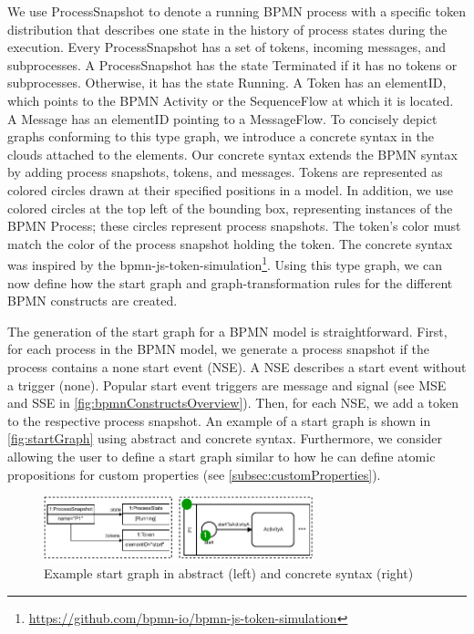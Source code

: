 \documentclass[runningheads]{llncs}
\begin{document}
We use \textsf{ProcessSnapshot} to denote a running BPMN process with a specific token distribution that describes one state in the history of process states during the execution.
Every \textsf{ProcessSnapshot} has a set of \textsf{tokens}, incoming \textsf{messages}, and \textsf{subprocesses}.
A \textsf{ProcessSnapshot} has the state \textsf{Terminated} if it has no \textsf{tokens} or \textsf{subprocesses}.
Otherwise, it has the state \textsf{Running}.
A \textsf{Token} has an \textsf{elementID}, which points to the BPMN \textsf{Activity} or the \textsf{SequenceFlow} at which it is located.
A \textsf{Message} has an \textsf{elementID} pointing to a \textsf{MessageFlow}.
To concisely depict graphs conforming to this type graph, we introduce a concrete syntax in the clouds attached to the elements.
Our concrete syntax extends the BPMN syntax by adding process snapshots, tokens, and messages.
Tokens are represented as colored circles drawn at their specified positions in a model.
In addition, we use colored circles at the top left of the bounding box, representing instances of the BPMN \textsf{Process}; these circles represent process snapshots.
The token's color must match the color of the process snapshot holding the token.
The concrete syntax was inspired by the bpmn-js-token-simulation\footnote{\url{https://github.com/bpmn-io/bpmn-js-token-simulation}}.
Using this type graph, we can now define how the start graph and graph-transformation rules for the different BPMN constructs are created.

The generation of the start graph for a BPMN model is straightforward.
First, for each process in the BPMN model, we generate a process snapshot if the process contains a none start event (NSE).
A NSE describes a start event without a trigger (none).
Popular start event triggers are message and signal (see MSE and SSE in \autoref{fig:bpmnConstructsOverview}).
Then, for each NSE, we add a token to the respective process snapshot.
An example of a start graph is shown in \autoref{fig:startGraph} using abstract and concrete syntax.
Furthermore, we consider allowing the user to define a start graph similar to how he can define atomic propositions for custom properties (see \autoref{subsec:customProperties}).

\begin{figure}[ht]
    \centering
    \includegraphics[width=0.7\textwidth]{images/startGraph.pdf}
    \caption{Example start graph in abstract (left) and concrete syntax (right)}
    \label{fig:startGraph}
\end{figure}
\end{document}
